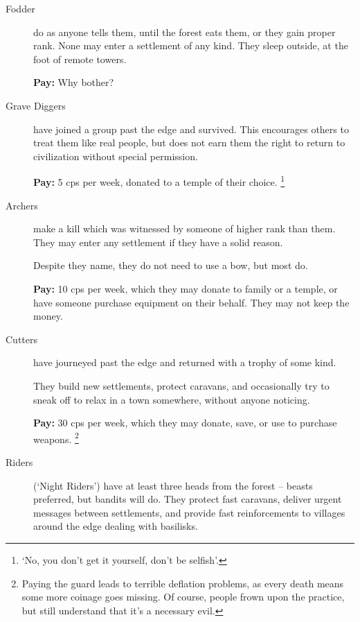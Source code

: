 \begin{multicols}{2}
\begin{description}
  \item[Fodder]
  \label{fodder}%
  do as anyone tells them, until the forest eats them, or they gain proper rank.
  None may enter a settlement of any kind.
  They sleep outside, at the foot of remote towers.

  \textbf{Pay:} Why bother?

  \item[Grave Diggers]
  have joined a group past the \gls{edge} and survived.
  This encourages others to treat them like real people, but does not earn them the right to return to civilization without special permission.

  \textbf{Pay:} 5 \glspl{cp} per week, donated to a temple of their choice.%
  \footnote{`No, you don't get it yourself, don't be selfish'.}

  \item[Archers]
  make a kill which was witnessed by someone of higher rank than them.
  They may enter any settlement if they have a solid reason.

  Despite they name, they do not need to use a bow, but most do.

  \textbf{Pay:} 10 \glspl{cp} per week, which they may donate to family or a temple, or have someone purchase equipment on their behalf.
  They may not keep the money.

  \item[Cutters]
  have journeyed past the \gls{edge} and returned with a trophy of some kind.

  They build new settlements, protect caravans, and occasionally try to sneak off to relax in a town somewhere, without anyone noticing.

  \textbf{Pay:} 30 \glspl{cp} per week, which they may donate, save, or use to purchase weapons.%
  \footnote{Paying the \gls{guard} leads to terrible deflation problems, as every death means some more coinage goes missing.
  Of course, people frown upon the practice, but still understand that it's a necessary evil.}

  \item[Riders]
  (`Night Riders')
  have at least three heads from the forest -- beasts preferred, but bandits will do.
  They protect fast caravans, deliver urgent messages between settlements, and provide fast reinforcements to villages around the \gls{edge} dealing with basilisks.


\end{description}
\end{multicols}
